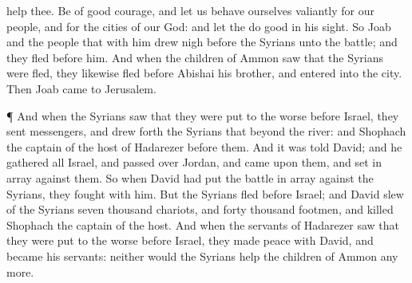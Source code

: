 {help thee.
Be of good
courage, and let us behave ourselves
valiantly for our
people, and for the
cities of our
God: and let the
{}
do
{}
good in his
sight.
So
Joab and the
people that
{} with him drew
nigh
before the
Syrians unto the
battle; and they
fled
before him.
And when the
children of
Ammon
saw that the
Syrians were
fled, they likewise
fled
before
Abishai his
brother, and
entered into the
city. Then
Joab
came to
Jerusalem.
\par }{\PP {}¶ And when the
Syrians
saw that they were put to the
worse
before
Israel, they
sent
messengers, and drew
forth the
Syrians that
{}
beyond the
river: and
Shophach the
captain of the
host of
Hadarezer
{}
before them.
And it was
told
David; and he
gathered all
Israel, and passed
over
Jordan, and
came upon them, and set
{} in
array against them. So when
David had put the
battle in
array
against the
Syrians, they
fought with him.
But the
Syrians
fled
before
Israel; and
David
slew of the
Syrians
seven
thousand
{}
chariots, and
forty
thousand
footmen, and
killed
Shophach the
captain of the
host.
And when the
servants of
Hadarezer
saw that they were put to the
worse
before
Israel, they made
peace with
David, and became his
servants: neither
would the
Syrians
help the
children of
Ammon any more.

}
